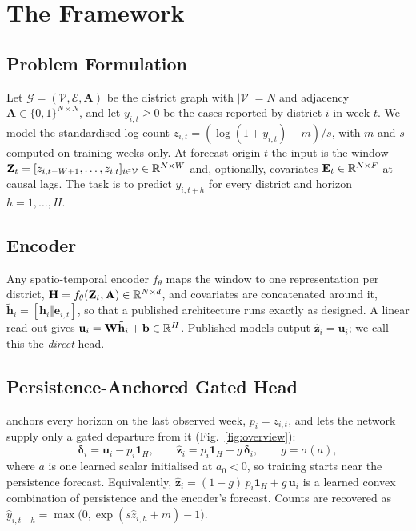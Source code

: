 \section{The \model{} Framework}
\label{sec:framework}

\subsection{Problem Formulation}
Let $\mathcal{G}=(\mathcal{V},\mathcal{E},\mathbf{A})$ be the district graph with
$|\mathcal{V}|=N$ and adjacency $\mathbf{A}\in\{0,1\}^{N\times N}$, and let
$y_{i,t}\ge0$ be the cases reported by district $i$ in week $t$. We model the
standardised log count $z_{i,t}=(\log(1+y_{i,t})-m)/s$, with $m$ and $s$ computed on
training weeks only. At forecast origin $t$ the input is the window
$\mathbf{Z}_t=[z_{i,t-W+1},\dots,z_{i,t}]_{i\in\mathcal{V}}\in\mathbb{R}^{N\times W}$ and,
optionally, covariates $\mathbf{E}_t\in\mathbb{R}^{N\times F}$ at causal lags. The task is to
predict $y_{i,t+h}$ for every district and horizon $h=1,\dots,H$.

\subsection{Encoder}
Any spatio-temporal encoder $f_\theta$ maps the window to one representation per
district, $\mathbf{H}=f_\theta(\mathbf{Z}_t,\mathbf{A})\in\mathbb{R}^{N\times d}$, and
covariates are concatenated around it, $\tilde{\mathbf{h}}_i=[\mathbf{h}_i\Vert
\mathbf{e}_{i,t}]$, so that a published architecture runs exactly as designed. A
linear read-out gives $\mathbf{u}_i=\mathbf{W}\tilde{\mathbf{h}}_i+\mathbf{b}\in\mathbb{R}^{H}$.
Published models output $\hat{\mathbf{z}}_i=\mathbf{u}_i$; we call this the
\emph{direct} head.

\subsection{Persistence-Anchored Gated Head}
\label{sec:page}
\model{} anchors every horizon on the last observed week, $p_i=z_{i,t}$, and lets the
network supply only a gated departure from it (Fig.~\ref{fig:overview}):
\begin{equation}
  \boldsymbol{\delta}_i=\mathbf{u}_i-p_i\mathbf{1}_H,\qquad
  \hat{\mathbf{z}}_i=p_i\mathbf{1}_H+g\,\boldsymbol{\delta}_i,\qquad g=\sigma(a),
  \label{eq:page}
\end{equation}
where $a$ is one learned scalar initialised at $a_0<0$, so training starts near the
persistence forecast. Equivalently, $\hat{\mathbf{z}}_i=(1-g)\,p_i\mathbf{1}_H+
g\,\mathbf{u}_i$ is a learned convex combination of persistence and the encoder's
forecast. Counts are recovered as
$\hat y_{i,t+h}=\max\!\big(0,\exp(s\hat z_{i,h}+m)-1\big)$.

